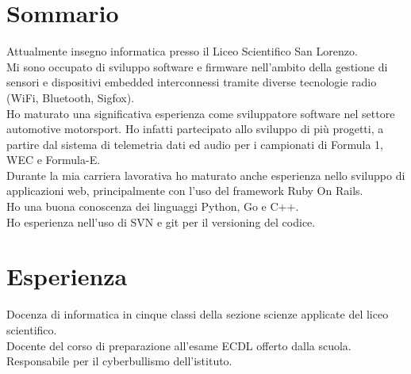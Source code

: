 \documentclass[]{deedy-resume-openfont}
\begin{document}
%
%

\begin{minipage}[t]{0.90\textwidth} 


\section{Sommario}
\vspace*{2mm}
Attualmente insegno informatica presso il Liceo Scientifico San Lorenzo.\\
Mi sono occupato di sviluppo software e firmware nell’ambito della gestione di sensori e dispositivi embedded interconnessi tramite diverse
tecnologie radio (WiFi, Bluetooth, Sigfox).\\
Ho maturato una significativa esperienza come sviluppatore software nel settore automotive motorsport. Ho infatti partecipato allo sviluppo di più
progetti, a partire dal sistema di telemetria dati ed audio per i campionati di Formula 1, WEC e Formula-E.\\
Durante la mia carriera lavorativa ho maturato anche esperienza nello sviluppo di applicazioni web, principalmente con l’uso del framework Ruby
On Rails.\\
Ho una buona conoscenza dei linguaggi Python, Go e C++.\\
Ho esperienza nell’uso di SVN e git per il versioning del codice.
\vspace*{2mm}

\section{Esperienza}
\vspace*{2mm}


Docenza di informatica in cinque classi della sezione scienze applicate del liceo scientifico.\\
Docente del corso di preparazione all'esame ECDL offerto dalla
scuola.\\
Responsabile per il cyberbullismo dell'istituto.
\vspace{\topsep}


\end{minipage}
\end{document}
